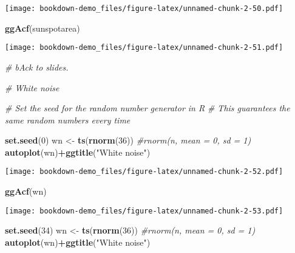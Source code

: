 \documentclass[]{book}
\newenvironment{Shaded}{\begin{snugshade}}{\end{snugshade}}
\newcommand{\CommentTok}[1]{\textcolor[rgb]{0.56,0.35,0.01}{\textit{#1}}}
\newcommand{\DecValTok}[1]{\textcolor[rgb]{0.00,0.00,0.81}{#1}}
\newcommand{\KeywordTok}[1]{\textcolor[rgb]{0.13,0.29,0.53}{\textbf{#1}}}
\newcommand{\NormalTok}[1]{#1}
\newcommand{\OperatorTok}[1]{\textcolor[rgb]{0.81,0.36,0.00}{\textbf{#1}}}
\newcommand{\StringTok}[1]{\textcolor[rgb]{0.31,0.60,0.02}{#1}}
\begin{document}
\texttt{[image: bookdown-demo\_files/figure-latex/unnamed-chunk-2-50.pdf]}

\begin{Shaded}
\begin{Highlighting}[]
  \KeywordTok{ggAcf}\NormalTok{(sunspotarea)}
\end{Highlighting}
\end{Shaded}

\texttt{[image: bookdown-demo\_files/figure-latex/unnamed-chunk-2-51.pdf]}

\begin{Shaded}
\begin{Highlighting}[]
\CommentTok{# bAck to slides.}

\CommentTok{# White noise}
  
  \CommentTok{# Set the seed for the random number generator in R}
  \CommentTok{# This guarantees the same random numbers every time}
  
  \KeywordTok{set.seed}\NormalTok{(}\DecValTok{0}\NormalTok{) }
\NormalTok{  wn <-}\StringTok{ }\KeywordTok{ts}\NormalTok{(}\KeywordTok{rnorm}\NormalTok{(}\DecValTok{36}\NormalTok{)) }\CommentTok{#rnorm(n, mean = 0, sd = 1)}
  \KeywordTok{autoplot}\NormalTok{(wn)}\OperatorTok{+}\KeywordTok{ggtitle}\NormalTok{(}\StringTok{"White noise"}\NormalTok{)}
\end{Highlighting}
\end{Shaded}

\texttt{[image: bookdown-demo\_files/figure-latex/unnamed-chunk-2-52.pdf]}

\begin{Shaded}
\begin{Highlighting}[]
  \KeywordTok{ggAcf}\NormalTok{(wn)}
\end{Highlighting}
\end{Shaded}

\texttt{[image: bookdown-demo\_files/figure-latex/unnamed-chunk-2-53.pdf]}

\begin{Shaded}
\begin{Highlighting}[]
  \KeywordTok{set.seed}\NormalTok{(}\DecValTok{34}\NormalTok{) }
\NormalTok{  wn <-}\StringTok{ }\KeywordTok{ts}\NormalTok{(}\KeywordTok{rnorm}\NormalTok{(}\DecValTok{36}\NormalTok{)) }\CommentTok{#rnorm(n, mean = 0, sd = 1)}
  \KeywordTok{autoplot}\NormalTok{(wn)}\OperatorTok{+}\KeywordTok{ggtitle}\NormalTok{(}\StringTok{"White noise"}\NormalTok{)}
\end{Highlighting}
\end{Shaded}
\end{document}
